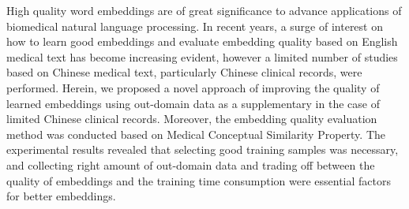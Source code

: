 High quality word embeddings are of great significance to advance applications of biomedical natural language processing. In recent years, a surge of interest on how to learn good embeddings and evaluate embedding quality based on English medical text has become increasing evident, however a limited number of studies based on Chinese medical text, particularly Chinese clinical records, were performed. Herein, we proposed a novel approach of improving the quality of learned embeddings using out-domain data as a supplementary in the case of limited Chinese clinical records. Moreover, the embedding quality evaluation method was conducted based on Medical Conceptual Similarity Property. The experimental results revealed that selecting good training samples was necessary, and collecting right amount of out-domain data and trading off between the quality of embeddings and the training time consumption were essential factors for better embeddings.
